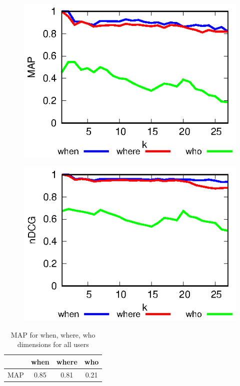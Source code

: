 \documentclass[11pt]{article}
\begin{document}
\begin{figure}[!htb]
\begin{minipage}{0.48\textwidth}
  \centering
  \includegraphics{submissions/Marian2023/plots/w5hMAP.eps}
  \label{fig-w5hMAP}
\end{minipage}\hfill
\begin{minipage}{0.48\textwidth}
  \centering
  \includegraphics{submissions/Marian2023/plots/w5h_nDCG.eps}
  \label{fig-w5h_nDCG}
\end{minipage}\hfill
\end{figure}


\begin{table}
\begin{center}
{
\begin{tabular}{|l||c|c|c|}
\hline
 & when & where & who \\
\hline
\hline
MAP& 0.85 & 0.81 & 0.21 \\
\hline
\end{tabular}
}
\caption{MAP for when, where, who dimensions for all users}
\label{table:w5h_MAP}
\end{center}
\end{table} 
\end{document}
